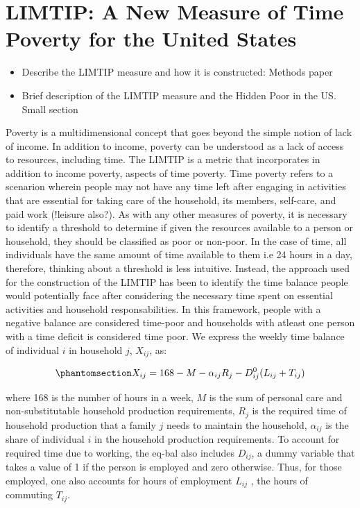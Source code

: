 \documentclass[
  11pt,
]{article}
\providecommand{\tightlist}{%
  \setlength{\itemsep}{0pt}\setlength{\parskip}{0pt}}\usepackage{longtable,booktabs,array}
\begin{document}
\section{LIMTIP: A New Measure of Time Poverty for the United
States}\label{limtip-a-new-measure-of-time-poverty-for-the-united-states}

\begin{itemize}
\tightlist
\item
  Describe the LIMTIP measure and how it is constructed: Methods paper
\item
  Brief description of the LIMTIP measure and the Hidden Poor in the US.
  Small section
\end{itemize}

Poverty is a multidimensional concept that goes beyond the simple notion
of lack of income. In addition to income, poverty can be understood as a
lack of access to resources, including time. The LIMTIP is a metric that
incorporates in addition to income poverty, aspects of time poverty.
Time poverty refers to a scenarion wherein people may not have any time
left after engaging in activities that are essential for taking care of
the household, its members, self-care, and paid work (!leisure also?).
As with any other measures of poverty, it is necessary to identify a
threshold to determine if given the resources available to a person or
household, they should be classified as poor or non-poor. In the case of
time, all individuals have the same amount of time available to them i.e
24 hours in a day, therefore, thinking about a threshold is less
intuitive. Instead, the approach used for the construction of the LIMTIP
has been to identify the time balance people would potentially face
after considering the necessary time spent on essential activities and
household responsabilities. In this framework, people with a negative
balance are considered time-poor and households with atleast one person
with a time deficit is considered time poor. We express the weekly time
balance of individual \(i\) in household \(j\), \(X_{ij}\), as:

\begin{equation}\phantomsection\label{eq-bal}{X_{ij} = 168 - M - \alpha_{ij}R_j-D_{ij}^0(L_{ij}+T_{ij})
}\end{equation}

where 168 is the number of hours in a week, \(M\) is the sum of personal
care and non-substitutable household production requirements, \(R_j\) is
the required time of household production that a family \(j\) needs to
maintain the household, \(\alpha_{ij}\) is the share of individual \(i\)
in the household production requirements. To account for required time
due to working, the eq-bal also includes \(D_{ij}\), a dummy variable
that takes a value of 1 if the person is employed and zero otherwise.
Thus, for those employed, one also accounts for hours of employment
\(L_{ij}\) , the hours of commuting \(T_{ij}\).
\end{document}
